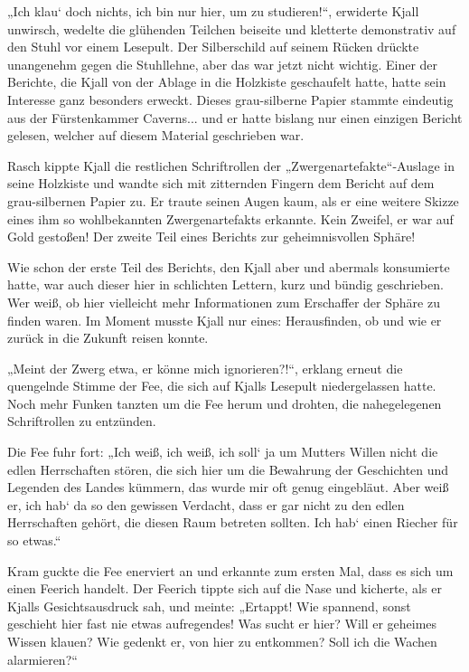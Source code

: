 \documentclass[10pt, a4paper, oneside]{book}
\begin{document}
„Ich klau‘ doch nichts, ich bin nur hier, um zu studieren!“, erwiderte Kjall unwirsch, wedelte die glühenden Teilchen beiseite und kletterte demonstrativ auf den Stuhl vor einem Lesepult. Der Silberschild auf seinem Rücken drückte unangenehm gegen die Stuhllehne, aber das war jetzt nicht wichtig. Einer der Berichte, die Kjall von der Ablage in die Holzkiste geschaufelt hatte, hatte sein Interesse ganz besonders erweckt. Dieses grau-silberne Papier stammte eindeutig aus der Fürstenkammer Caverns... und er hatte bislang nur einen einzigen Bericht gelesen, welcher auf diesem Material geschrieben war.

Rasch kippte Kjall die restlichen Schriftrollen der „Zwergenartefakte“-Auslage in seine Holzkiste und wandte sich mit zitternden Fingern dem Bericht auf dem grau-silbernen Papier zu. Er traute seinen Augen kaum, als er eine weitere Skizze eines ihm so wohlbekannten Zwergenartefakts erkannte. Kein Zweifel, er war auf Gold gestoßen! Der zweite Teil eines Berichts zur geheimnisvollen Sphäre!

Wie schon der erste Teil des Berichts, den Kjall aber und abermals konsumierte hatte, war auch dieser hier in schlichten Lettern, kurz und bündig geschrieben. Wer weiß, ob hier vielleicht mehr Informationen zum Erschaffer der Sphäre zu finden waren. Im Moment musste Kjall nur eines: Herausfinden, ob und wie er zurück in die Zukunft reisen konnte.

„Meint der Zwerg etwa, er könne mich ignorieren?!“, erklang erneut die quengelnde Stimme der Fee, die sich auf Kjalls Lesepult niedergelassen hatte. Noch mehr Funken tanzten um die Fee herum und drohten, die nahegelegenen Schriftrollen zu entzünden.

Die Fee fuhr fort: „Ich weiß, ich weiß, ich soll‘ ja um Mutters Willen nicht die edlen Herrschaften stören, die sich hier um die Bewahrung der Geschichten und Legenden des Landes kümmern, das wurde mir oft genug eingebläut. Aber weiß er, ich hab‘ da so den gewissen Verdacht, dass er gar nicht zu den edlen Herrschaften gehört, die diesen Raum betreten sollten. Ich hab‘ einen Riecher für so etwas.“

Kram guckte die Fee enerviert an und erkannte zum ersten Mal, dass es sich um einen Feerich handelt. Der Feerich tippte sich auf die Nase und kicherte, als er Kjalls Gesichtsausdruck sah, und meinte: „Ertappt! Wie spannend, sonst geschieht hier fast nie etwas aufregendes! Was sucht er hier? Will er geheimes Wissen klauen? Wie gedenkt er, von hier zu entkommen? Soll ich die Wachen alarmieren?“
\end{document}
